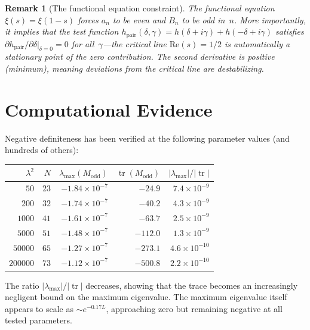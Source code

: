 \documentclass[11pt,a4paper]{article}
\newtheorem{remark}{Remark}
\DeclareMathOperator{\tr}{tr}
\begin{document}
\begin{remark}[The functional equation constraint]
The functional equation $\xi(s) = \xi(1-s)$ forces $a_n$ to be even and $B_n$ to be odd in~$n$. More importantly, it implies that the test function $h_{\mathrm{pair}}(\delta, \gamma) = h(\delta + i\gamma) + h(-\delta + i\gamma)$ satisfies $\partial h_{\mathrm{pair}} / \partial \delta \big|_{\delta = 0} = 0$ for all~$\gamma$---the critical line $\mathrm{Re}(s) = 1/2$ is automatically a stationary point of the zero contribution. The second derivative is positive (minimum), meaning deviations from the critical line are destabilizing.
\end{remark}

\section{Computational Evidence}\label{sec:evidence}

Negative definiteness has been verified at the following parameter values (and hundreds of others):

\begin{center}
\begin{tabular}{rrrrr}
\toprule
$\lambda^2$ & $N$ & $\lambda_{\max}(M_{\mathrm{odd}})$ & $\tr(M_{\mathrm{odd}})$ & $|\lambda_{\max}|/|\tr|$ \\
\midrule
$50$ & $23$ & $-1.84 \times 10^{-7}$ & $-24.9$ & $7.4 \times 10^{-9}$ \\
$200$ & $32$ & $-1.74 \times 10^{-7}$ & $-40.2$ & $4.3 \times 10^{-9}$ \\
$1000$ & $41$ & $-1.61 \times 10^{-7}$ & $-63.7$ & $2.5 \times 10^{-9}$ \\
$5000$ & $51$ & $-1.48 \times 10^{-7}$ & $-112.0$ & $1.3 \times 10^{-9}$ \\
$50000$ & $65$ & $-1.27 \times 10^{-7}$ & $-273.1$ & $4.6 \times 10^{-10}$ \\
$200000$ & $73$ & $-1.12 \times 10^{-7}$ & $-500.8$ & $2.2 \times 10^{-10}$ \\
\bottomrule
\end{tabular}
\end{center}

The ratio $|\lambda_{\max}|/|\tr|$ decreases, showing that the trace becomes an increasingly negligent bound on the maximum eigenvalue. The maximum eigenvalue itself appears to scale as $\sim e^{-0.17 L}$, approaching zero but remaining negative at all tested parameters.
\end{document}
